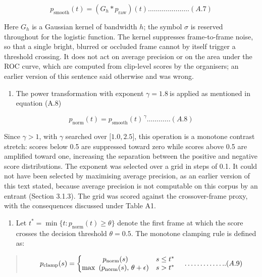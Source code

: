 \[p_{\text{smooth}}(t) = \left( G_{h} * p_{\text{raw}} \right)(t)\ldots\ldots\ldots\ldots\ldots\ldots\ldots(A.7)\]

Here \(G_{h}\) is a Gaussian kernel of bandwidth \(h\); the symbol \(\sigma\) is reserved throughout for the logistic function. The kernel suppresses frame-to-frame noise, so that a single bright, blurred or occluded frame cannot by itself trigger a threshold crossing. It does not act on average precision or on the area under the ROC curve, which are computed from clip-level scores by the organisers; an earlier version of this sentence said otherwise and was wrong.

\begin{enumerate}
\def\labelenumi{\arabic{enumi}.}
\setcounter{enumi}{2}
\item
  The power transformation with exponent \(\gamma = 1.8\ \)is applied as mentioned in equation (A.8)
\end{enumerate}

\[p_{\text{norm}}(t) = p_{\text{smooth}}(t)^{\,\gamma}\ldots\ldots\ldots\ldots(A.8)\]

Since \(\gamma > 1\), with \(\gamma\) searched over \(\lbrack 1.0,2.5\rbrack\), this operation is a monotone contrast stretch: scores below 0.5 are suppressed toward zero while scores above 0.5 are amplified toward one, increasing the separation between the positive and negative score distributions. The exponent was selected over a grid in steps of 0.1. It could not have been selected by maximising average precision, as an earlier version of this text stated, because average precision is not computable on this corpus by an entrant (Section 3.1.3). The grid was scored against the crossover-frame proxy, with the consequences discussed under Table A1.

\begin{enumerate}
\def\labelenumi{\arabic{enumi}.}
\setcounter{enumi}{3}
\item
  Let \(t^{*} = \min\{ t:p_{\text{norm}}(t) \geq \theta\}\) denote the first frame at which the score crosses the decision threshold \(\theta = 0.5\). The monotone clamping rule is defined as:
\end{enumerate}

\begin{quote}
\[\begin{matrix}
 & p_{\text{clamp}}(s) = \left\{ \begin{matrix}
p_{\text{norm}}(s) & s \leq t^{*} \\
\max\text{\,}\left( p_{\text{norm}}(s),\text{\,}\theta + \epsilon \right) & s > t^{*}
\end{matrix} \right.\  & \ldots\ldots\ldots\ldots..(A.9) & 
\end{matrix}\]
\end{quote}

